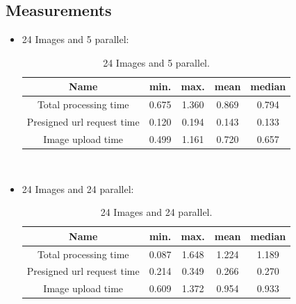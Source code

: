 \documentclass[conference]{IEEEtran}
\begin{document}
\subsection{Measurements}
\begin{itemize}
      \item 24 Images and 5 parallel:
            \begin{table}[ht]
                  \begin{tabulary}{\textwidth}{|C|C|C|C|C|}
                        \hline
                        \textbf{Name} &
                        \textbf{min.} &
                        \textbf{max.} &
                        \textbf{mean} &
                        \textbf{median}
                        \\\hline
                        Total processing time & 0.675 & 1.360 & 0.869 & 0.794  \\\hline
                        Presigned url request time & 0.120 & 0.194 & 0.143 & 0.133  \\\hline
                        Image upload time & 0.499 & 1.161 & 0.720 & 0.657  \\\hline
                  \end{tabulary}
                  \\
                  \caption{24 Images and 5 parallel.}
            \end{table}

      \item 	 24 Images and 24 parallel:
            \begin{table}[ht]
                  \begin{tabulary}{\textwidth}{|C|C|C|C|C|}
                        \hline
                        \textbf{Name} &
                        \textbf{min.} &
                        \textbf{max.} &
                        \textbf{mean} &
                        \textbf{median}
                        \\\hline
                        Total processing time & 0.087 & 1.648 & 1.224 & 1.189  \\\hline
                        Presigned url request time & 0.214 & 0.349 & 0.266 & 0.270  \\\hline
                        Image upload time & 0.609 & 1.372 & 0.954 & 0.933  \\\hline
                  \end{tabulary}
                  \\
                  \caption{24 Images and 24 parallel.}
            \end{table}



\end{itemize}
\end{document}
